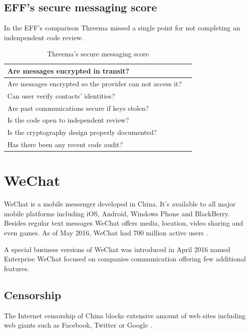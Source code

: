 \documentclass[thesis=M,english]{FITthesis}[2012/10/20]
\newcommand{\cmark}{\ding{51}}%
\newcommand{\xmark}{\ding{55}}%
\begin{document}
\subsection{EFF's secure messaging score}

In the EFF's comparison Threema missed a single point for not completing an indenpendent code review. \cite{eff-score}

\begin{table}[htb]
	\centering
	\caption{Threema's secure messaging score}
	\label{my-label}
	\begin{tabular}{|l|l|}
		\hline
		Are messages encrypted in transit? & \cmark \\\hline
		Are messages encrypted so the provider can not access it? & \cmark \\ \hline
		Can user verify contacts' identities? & \cmark \\ \hline
		Are past communications secure if keys stolen? & \cmark \\ \hline
		Is the code open to independent review? & \xmark \\ \hline
		Is the cryptography design properly documented? & \cmark \\ \hline
		Has there been any recent code audit? & \cmark \\ \hline
	\end{tabular}
\end{table}


\section{WeChat}

WeChat is a mobile messenger developed in China. It's available to all major mobile platforms including iOS, Android, Windows Phone and BlackBerry. Besides regular text messages WeChat offers media, location, video sharing and even games. As of May 2016, WeChat had 700 million active users \cite{wechat-users}.

A special business versions of WeChat was introduced in April 2016 named Enterprise WeChat focused on companies communication offering few additional features.

\subsection{Censorship}

The Internet censorship of China blocks extensive amount of web sites including web giants such as Facebook, Twitter or Google \cite{china-twitter}\cite{china-facebook}.
\end{document}
